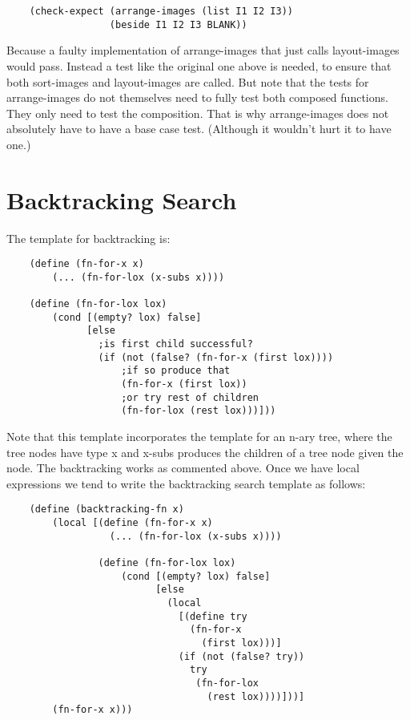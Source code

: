 \documentclass[11pt,a4paper]{report}
\begin{document}
	\begin{verbatim}
	(check-expect (arrange-images (list I1 I2 I3))
	              (beside I1 I2 I3 BLANK))
	\end{verbatim}
	
	Because a faulty implementation of arrange-images that just calls layout-images would pass.
	Instead a test like the original one above is needed, to ensure that both sort-images and
	layout-images are called. But note that the tests for arrange-images do not themselves need to
	fully test both composed functions. They only need to test the composition. That is why
	arrange-images does not absolutely have to have a base case test. (Although it wouldn't hurt it
	to have one.)
	
	\section{Backtracking Search} \label{sec:back_srch}
	The template for backtracking is:
	
	\begin{verbatim}
	(define (fn-for-x x)
		(... (fn-for-lox (x-subs x))))
	
	(define (fn-for-lox lox)
		(cond [(empty? lox) false]
		      [else
		        ;is first child successful?
		        (if (not (false? (fn-for-x (first lox))))
		            ;if so produce that
		            (fn-for-x (first lox))
		            ;or try rest of children
		            (fn-for-lox (rest lox)))]))
	\end{verbatim}
	
	Note that this template incorporates the template for an n-ary tree, where the tree nodes have
	type x and x-subs produces the children of a tree node given the node. The backtracking works
	as commented above. Once we have local expressions we tend to write the backtracking search
	template as follows:
	
	\begin{verbatim}
	(define (backtracking-fn x)
		(local [(define (fn-for-x x)
		          (... (fn-for-lox (x-subs x))))
		        
		        (define (fn-for-lox lox)
		        	(cond [(empty? lox) false]
			              [else
			                (local 
			                  [(define try 
			                    (fn-for-x 
			                      (first lox)))]
			                  (if (not (false? try))
			                    try
			                     (fn-for-lox 
			                       (rest lox))))]))]
		(fn-for-x x)))
	\end{verbatim}
	\pagebreak
\end{document}
